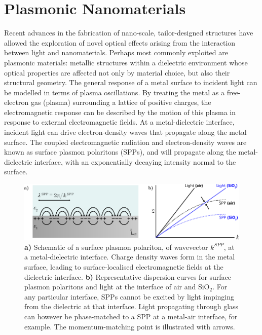\chapter{Plasmonic Nanomaterials}\label{sec:background:Plasmonics}
Recent advances in the fabrication of nano-scale, tailor-designed structures have allowed the exploration of novel optical effects arising from the interaction between light and nanomaterials. Perhaps most commonly exploited are plasmonic materials: metallic structures within a dielectric environment whose optical properties are affected not only by material choice, but also their structural geometry. 
The general response of a metal surface to incident light can be modelled in terms of plasma oscillations. By treating the metal as a free-electron gas (plasma) surrounding a lattice of positive charges, the electromagnetic response can be described by the motion of this plasma in response to external electromagnetic fields. 
At a metal-dielectric interface, incident light can drive electron-density waves that propagate along the metal surface. The coupled electromagnetic radiation and electron-density waves are known as surface plasmon polaritons (SPPs), and will propagate along the metal-dielectric interface, with an exponentially decaying intensity normal to the surface. 

\begin{figure}[htb!]
    \centering
    \includegraphics[scale=1.0]{./figures/background/plasmonics/spp.pdf}
    \caption{\label{fig:background:Plasmonics:SPP} \textbf{a)} Schematic of a surface plasmon polariton, of wavevector $k^{SPP}$, at a metal-dielectric interface. Charge density waves form in the metal surface, leading to surface-localised electromagnetic fields at the dielectric interface. \textbf{b)} Representative dispersion curves for surface plasmon polaritons and light at the interface of air and SiO$_2$. For any particular interface, SPPs cannot be excited by light impinging from the dielectric at that interface. Light propagating through glass can however be phase-matched to a SPP at a metal-air interface, for example. The momentum-matching point is illustrated with arrows. }
\end{figure}

